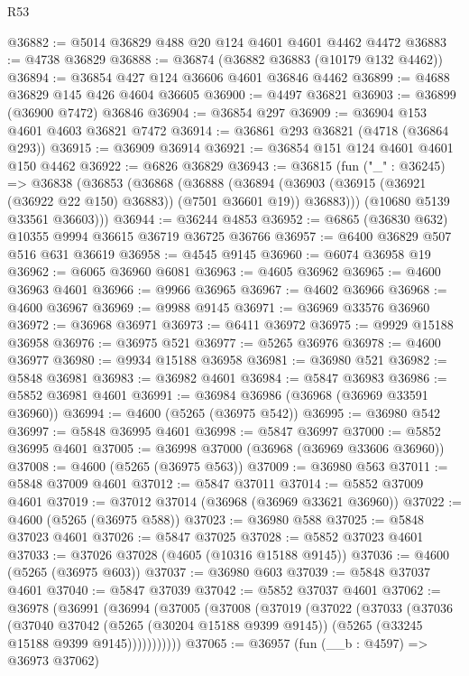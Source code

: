 \begin{lexlean}{R53}
\begin{coremodule}
@36882 := @5014 @36829 @488 @20 @124 @4601 @4601 @4462 @4472
@36883 := @4738 @36829
@36888 := @36874 (@36882 @36883 (@10179 @132 @4462))
@36894 := @36854 @427 @124 @36606 @4601 @36846 @4462
@36899 := @4688 @36829 @145 @426 @4604 @36605
@36900 := @4497 @36821
@36903 := @36899 (@36900 @7472) @36846
@36904 := @36854 @297
@36909 := @36904 @153 @4601 @4603 @36821 @7472
@36914 := @36861 @293 @36821 (@4718 (@36864 @293))
@36915 := @36909 @36914
@36921 := @36854 @151 @124 @4601 @4601 @150 @4462
@36922 := @6826 @36829
@36943 := @36815
    (fun ("_" : @36245) =>
    @36838
      (@36853
        (@36868
          (@36888
            (@36894 (@36903 (@36915 (@36921 (@36922 @22 @150) @36883)) (@7501 @36601 @19)) @36883)))
        (@10680 @5139 @33561 @36603)))
@36944 := @36244 @4853
@36952 := @6865 (@36830 @632) @10355 @9994 @36615 @36719 @36725 @36766
@36957 := @6400 @36829 @507 @516 @631 @36619
@36958 := @4545 @9145
@36960 := @6074 @36958 @19
@36962 := @6065 @36960 @6081
@36963 := @4605 @36962
@36965 := @4600 @36963 @4601
@36966 := @9966 @36965
@36967 := @4602 @36966
@36968 := @4600 @36967
@36969 := @9988 @9145
@36971 := @36969 @33576 @36960
@36972 := @36968 @36971
@36973 := @6411 @36972
@36975 := @9929 @15188 @36958
@36976 := @36975 @521
@36977 := @5265 @36976
@36978 := @4600 @36977
@36980 := @9934 @15188 @36958
@36981 := @36980 @521
@36982 := @5848 @36981
@36983 := @36982 @4601
@36984 := @5847 @36983
@36986 := @5852 @36981 @4601
@36991 := @36984 @36986 (@36968 (@36969 @33591 @36960))
@36994 := @4600 (@5265 (@36975 @542))
@36995 := @36980 @542
@36997 := @5848 @36995 @4601
@36998 := @5847 @36997
@37000 := @5852 @36995 @4601
@37005 := @36998 @37000 (@36968 (@36969 @33606 @36960))
@37008 := @4600 (@5265 (@36975 @563))
@37009 := @36980 @563
@37011 := @5848 @37009 @4601
@37012 := @5847 @37011
@37014 := @5852 @37009 @4601
@37019 := @37012 @37014 (@36968 (@36969 @33621 @36960))
@37022 := @4600 (@5265 (@36975 @588))
@37023 := @36980 @588
@37025 := @5848 @37023 @4601
@37026 := @5847 @37025
@37028 := @5852 @37023 @4601
@37033 := @37026 @37028 (@4605 (@10316 @15188 @9145))
@37036 := @4600 (@5265 (@36975 @603))
@37037 := @36980 @603
@37039 := @5848 @37037 @4601
@37040 := @5847 @37039
@37042 := @5852 @37037 @4601
@37062 := @36978
    (@36991
      (@36994
        (@37005
          (@37008
            (@37019
              (@37022
                (@37033
                  (@37036
                    (@37040
                      @37042
                      (@5265 (@30204 @15188 @9399 @9145))
                      (@5265 (@33245 @15188 @9399 @9145)))))))))))
@37065 := @36957 (fun (__b : @4597) => @36973 @37062)

\end{coremodule}
\end{lexlean}
